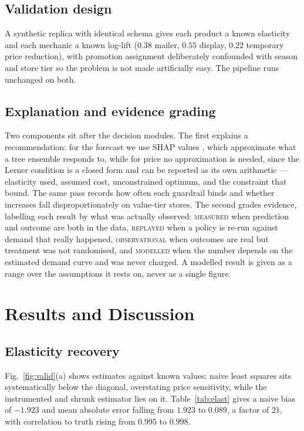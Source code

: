 \documentclass[conference,a4paper]{IEEEtran}
\begin{document}
\subsection{Validation design}
A synthetic replica with identical schema gives each product a known elasticity
and each mechanic a known log-lift ($0.38$ mailer, $0.55$ display, $0.22$
temporary price reduction), with promotion assignment deliberately confounded
with season and store tier so the problem is not made artificially easy. The
pipeline runs unchanged on both.

\subsection{Explanation and evidence grading}
Two components sit after the decision modules. The first explains a
recommendation: for the forecast we use SHAP values \cite{lundberg2017}, which
approximate what a tree ensemble responds to, while for price no approximation is
needed, since the Lerner condition is a closed form and can be reported as its own
arithmetic --- elasticity used, assumed cost, unconstrained optimum, and the
constraint that bound. The same pass records how often each guardrail binds and
whether increases fall disproportionately on value-tier stores. The second grades
evidence, labelling each result by what was actually observed:
\textsc{measured} when prediction and outcome are both in the data,
\textsc{replayed} when a policy is re-run against demand that really happened,
\textsc{observational} when outcomes are real but treatment was not randomised,
and \textsc{modelled} when the number depends on the estimated demand curve and
was never charged. A modelled result is given as a range over the assumptions it
rests on, never as a single figure.

\section{Results and Discussion}

\subsection{Elasticity recovery}
Fig.~\ref{fig:valid}(a) shows estimates against known values: naive least squares
sits systematically below the diagonal, overstating price sensitivity, while the
instrumented and shrunk estimator lies on it. Table~\ref{tab:elast} gives a naive
bias of $-1.923$ and mean absolute error falling from $1.923$ to $0.089$, a factor
of $21$, with correlation to truth rising from $0.995$ to $0.998$.
\end{document}
